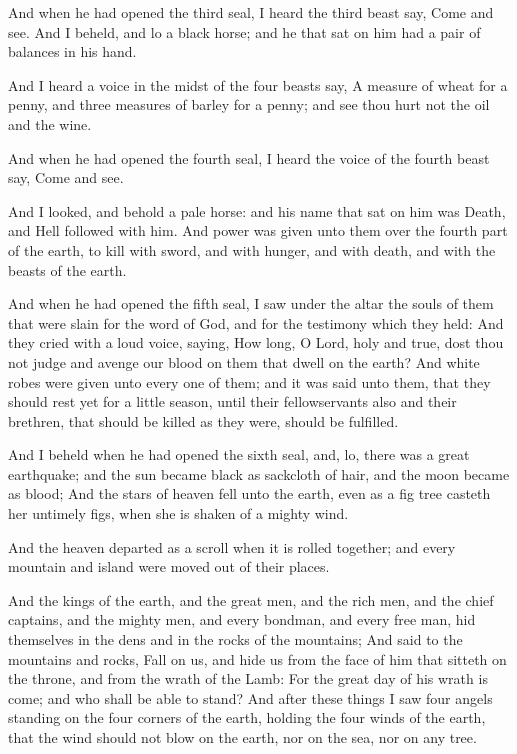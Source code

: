 \Verse And when he had opened the third seal, I heard the third beast say, Come and see. And I beheld, and lo a black horse; and he that sat on him had a pair of balances in his hand.

\Verse And I heard a voice in the midst of the four beasts say, A measure of wheat for a penny, and three measures of barley for a penny; and see thou hurt not the oil and the wine.

\Verse And when he had opened the fourth seal, I heard the voice of the fourth beast say, Come and see.

\Verse And I looked, and behold a pale horse: and his name that sat on him was Death, and Hell followed with him. And power was given unto them over the fourth part of the earth, to kill with sword, and with hunger, and with death, and with the beasts of the earth.

\Verse And when he had opened the fifth seal, I saw under the altar the souls of them that were slain for the word of God, and for the testimony which they held: \Verse And they cried with a loud voice, saying, How long, O Lord, holy and true, dost thou not judge and avenge our blood on them that dwell on the earth?  \Verse And white robes were given unto every one of them; and it was said unto them, that they should rest yet for a little season, until their fellowservants also and their brethren, that should be killed as they were, should be fulfilled.

\Verse And I beheld when he had opened the sixth seal, and, lo, there was a great earthquake; and the sun became black as sackcloth of hair, and the moon became as blood; \Verse And the stars of heaven fell unto the earth, even as a fig tree casteth her untimely figs, when she is shaken of a mighty wind.

\Verse And the heaven departed as a scroll when it is rolled together; and every mountain and island were moved out of their places.

\Verse And the kings of the earth, and the great men, and the rich men, and the chief captains, and the mighty men, and every bondman, and every free man, hid themselves in the dens and in the rocks of the mountains; \Verse And said to the mountains and rocks, Fall on us, and hide us from the face of him that sitteth on the throne, and from the wrath of the Lamb: \Verse For the great day of his wrath is come; and who shall be able to stand?  \Chapter \Verse And after these things I saw four angels standing on the four corners of the earth, holding the four winds of the earth, that the wind should not blow on the earth, nor on the sea, nor on any tree.


